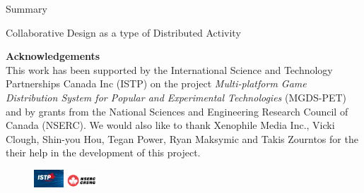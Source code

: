 \documentclass[handout]{beamer}
\begin{document}
\begin{frame}{Summary}
\begin{frame}{Collaborative Design as a type of Distributed Activity}
\begin{multicols}{2}
\begin{center}
\end{center}


\textbf{Acknowledgements}\\
This work has been supported by the International Science and Technology Partnerships Canada Inc (ISTP) on the project \textit{Multi-platform Game Distribution System for Popular and Experimental Technologies} (MGDS-PET) and by grants from the National Sciences and Engineering Research Council of Canada (NSERC). We would also like to thank Xenophile Media Inc., Vicki Clough, Shin-you Hou, Tegan Power, Ryan Maksymic and Takis Zourntos for the their help in the development of this project.\\
\begin{figure}[H] \centering
\includegraphics[width=0.1\textwidth]{graphics/ISTP_logo.png}
\hspace{2em}
\includegraphics[width=0.1\textwidth]{graphics/nserc_logo_color.png}
\end{figure}


\begin{center}
\end{center}
\end{multicols}
\end{frame}
\end{frame}
\end{document}

